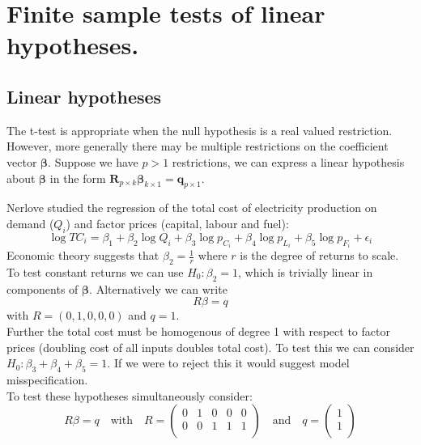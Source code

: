 \documentclass[DIV=14,titlepage=false]{scrreprt}
\begin{document}
\vspace{-10pt}
\setcounter{chapter}{4}

\chapter{Finite sample tests of linear hypotheses.}
\vspace{-10pt}
\section{Linear hypotheses}
The t-test is appropriate when the null hypothesis is a real valued restriction. However, more generally there may be multiple restrictions on the coefficient vector $\boldsymbol{\beta}$. Suppose we have $p>1$ restrictions, we can express a linear hypothesis about $\boldsymbol{\beta}$ in the form $\boldsymbol{R}_{p \times k}\boldsymbol{\beta}_{k \times 1}=\boldsymbol{q}_{p \times 1}$.

\begin{example}
    Nerlove studied the regression of the total cost of electricity production on demand ($Q_i$) and factor prices (capital, labour and fuel):
    \[ \log TC_i = \beta_1 + \beta_2 \log Q_i + \beta_3 \log p_{C_i} + \beta_4 \log p_{L_i}+ \beta_5 \log p_{F_i} + \epsilon_i \]
    Economic theory suggests that $\beta_2=\frac{1}{r}$ where $r$ is the degree of returns to scale. To test constant returns we can use $H_0: \beta_2=1$, which is trivially linear in components of $\boldsymbol{\beta}$. Alternatively we can write \[R\beta=q\] with $R=(0,1,0,0,0)$ and $q=1$.\\
    Further the total cost must be homogenous of degree 1 with respect to factor prices (doubling cost of all inputs doubles total cost). To test this we can consider $H_0: \beta_3 + \beta_4 +\beta_5 =1$. If we were to reject this it would suggest model misspecification.\\
    To test these hypotheses simultaneously consider:
    \[
        R\beta = q \quad \text{with} \quad R = \begin{pmatrix}
        0 & 1 & 0 & 0 & 0 \\
        0 & 0 & 1 & 1 & 1 \\
        \end{pmatrix}
        \quad \text{and} \quad q = \begin{pmatrix}
        1 \\
        1 \\
        \end{pmatrix}
        \]
\end{example}
\end{document}
